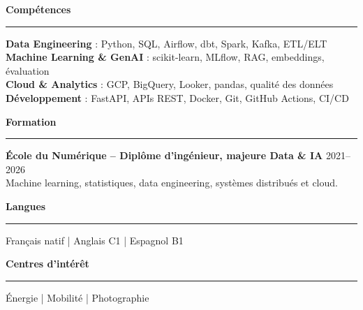 \documentclass[10.5pt,a4paper]{article}
\newcommand{\cvsection}[1]{\par\vspace{5pt}\textbf{\large #1}\par\vspace{1pt}\rule{\linewidth}{0.35pt}\vspace{2pt}}
\begin{document}
\cvsection{Compétences}
\textbf{Data Engineering} : Python, SQL, Airflow, dbt, Spark, Kafka, ETL/ELT\\
\textbf{Machine Learning \& GenAI} : scikit-learn, MLflow, RAG, embeddings, évaluation\\
\textbf{Cloud \& Analytics} : GCP, BigQuery, Looker, pandas, qualité des données\\
\textbf{Développement} : FastAPI, APIs REST, Docker, Git, GitHub Actions, CI/CD

\cvsection{Formation}
\textbf{École du Numérique -- Diplôme d'ingénieur, majeure Data \& IA} \hfill 2021--2026\\
Machine learning, statistiques, data engineering, systèmes distribués et cloud.

\cvsection{Langues}
Français natif | Anglais C1 | Espagnol B1

\cvsection{Centres d'intérêt}
Énergie | Mobilité | Photographie
\end{document}
